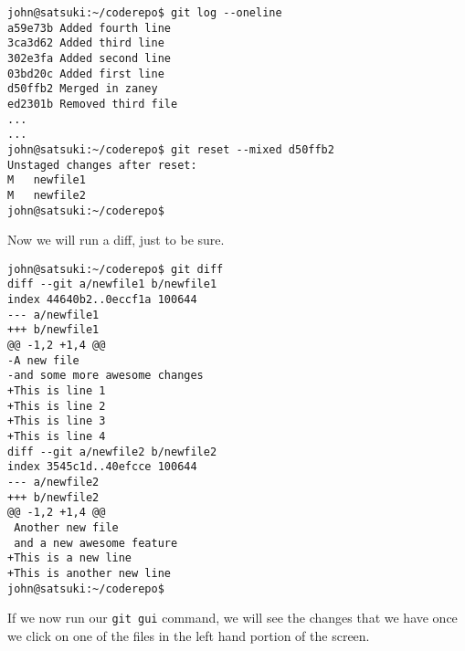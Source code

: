 \begin{Verbatim}[frame=leftline,framerule=1mm,fontsize=\relsize{-3}] 
john@satsuki:~/coderepo$ git log --oneline
a59e73b Added fourth line
3ca3d62 Added third line
302e3fa Added second line
03bd20c Added first line
d50ffb2 Merged in zaney
ed2301b Removed third file
...
...
john@satsuki:~/coderepo$ git reset --mixed d50ffb2
Unstaged changes after reset:
M	newfile1
M	newfile2
john@satsuki:~/coderepo$ 
\end{Verbatim}

Now we will run a diff, just to be sure.

\begin{Verbatim}[frame=leftline,framerule=1mm,fontsize=\relsize{-3}] 
john@satsuki:~/coderepo$ git diff
diff --git a/newfile1 b/newfile1
index 44640b2..0eccf1a 100644
--- a/newfile1
+++ b/newfile1
@@ -1,2 +1,4 @@
-A new file
-and some more awesome changes
+This is line 1
+This is line 2
+This is line 3
+This is line 4
diff --git a/newfile2 b/newfile2
index 3545c1d..40efcce 100644
--- a/newfile2
+++ b/newfile2
@@ -1,2 +1,4 @@
 Another new file
 and a new awesome feature
+This is a new line
+This is another new line
john@satsuki:~/coderepo$ 
\end{Verbatim}

If we now run our \texttt{git gui} command, we will see the changes that we have once we click on one of the files in the left hand portion of the screen.
